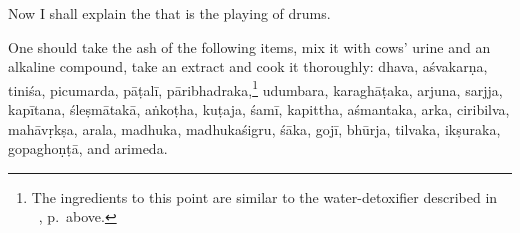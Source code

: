 \begin{translation}
    
    \item[1] Now I shall explain the  that is the playing of 
    drums.
    
    \item[3] 
     One should take the ash of the following items, mix it with 
     cows' urine and an alkaline compound, take an extract and cook 
     it thoroughly:
     \gls{dhava},
     \gls{aśvakarṇa},
     \gls{tiniśa}, 
     \gls{picumarda}, 
     \gls{pāṭalī}, 
     \gls{pāribhadraka},\footnote{\label{drum-detox}The ingredients to this point
         are similar to the water-detoxifier described in \SS\ , 
         p.\,\pageref{water-detox} above.}
     \gls{udumbara}, 
     \gls{karaghāṭaka}, 
     \gls{arjuna},
     \gls{sarjja}, 
     \gls{kapītana}, 
     \gls{śleṣmātakā}, 
     \gls{aṅkoṭha},
     \gls{kuṭaja},
     \gls{śamī}, 
     \gls{kapittha},
     \gls{aśmantaka},
     \gls{arka},
     \gls{ciribilva}, 
     \gls{mahāvṛkṣa}, 
     \gls{arala}, 
     \gls{madhuka},
     \gls{madhukaśigru}, 
     \gls{śāka},
     \gls{gojī}, 
     \gls{bhūrja}, 
     \gls{tilvaka},
     \gls{ikṣuraka},
     \gls{gopaghoṇṭā}, 
     and
     \gls{arimeda}.
     

\end{translation}
